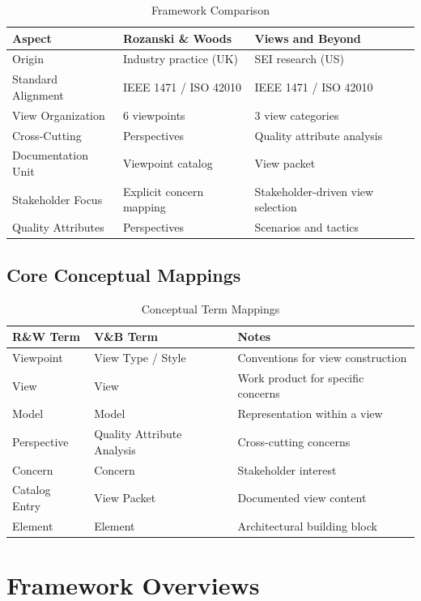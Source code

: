 \documentclass[11pt]{article}
\begin{document}
\begin{longtable}{@{}L{3.4cm} L{4.3cm} L{4.8cm}@{}}
\caption{Framework Comparison} \\
\toprule
\textbf{Aspect} & \textbf{Rozanski \& Woods} & \textbf{Views and Beyond} \\
\midrule
\endfirsthead
\bottomrule
\endlastfoot
Origin & Industry practice (UK) & SEI research (US) \\
Standard Alignment & IEEE 1471 / ISO 42010 & IEEE 1471 / ISO 42010 \\
View Organization & 6 viewpoints & 3 view categories \\
Cross-Cutting & Perspectives & Quality attribute analysis \\
Documentation Unit & Viewpoint catalog & View packet \\
Stakeholder Focus & Explicit concern mapping & Stakeholder-driven view selection \\
Quality Attributes & Perspectives & Scenarios and tactics \\
\end{longtable}

\subsection{Core Conceptual Mappings}

\begin{longtable}{@{}L{4cm} L{4cm} L{4.5cm}@{}}
\caption{Conceptual Term Mappings} \\
\toprule
\textbf{R\&W Term} & \textbf{V\&B Term} & \textbf{Notes} \\
\midrule
\endfirsthead
\bottomrule
\endlastfoot
Viewpoint & View Type / Style & Conventions for view construction \\
View & View & Work product for specific concerns \\
Model & Model & Representation within a view \\
Perspective & Quality Attribute Analysis & Cross-cutting concerns \\
Concern & Concern & Stakeholder interest \\
Catalog Entry & View Packet & Documented view content \\
Element & Element & Architectural building block \\
\end{longtable}

\section{Framework Overviews}
\end{document}
